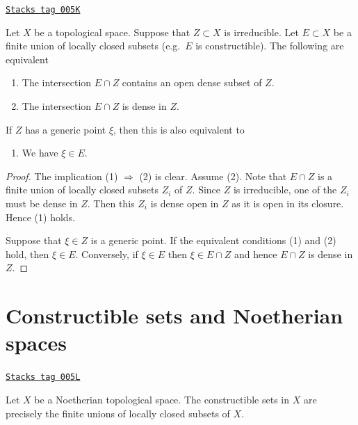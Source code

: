 \begin{lemma}
\label{topology-lemma-generic-point-in-constructible}
\href{https://stacks.math.columbia.edu/tag/005K}{\texttt{Stacks tag 005K}}

Let $X$ be a topological space. Suppose that
$Z \subset X$ is irreducible. Let $E \subset X$
be a finite union of locally closed subsets (e.g.\ $E$
is constructible). The following are equivalent
\begin{enumerate}
\item The intersection $E \cap Z$ contains an open
dense subset of $Z$.
\item The intersection $E \cap Z$ is dense in $Z$.
\end{enumerate}
If $Z$ has a generic point $\xi$, then this is
also equivalent to
\begin{enumerate}
\item[(3)] We have $\xi \in E$.
\end{enumerate}
\end{lemma}

\begin{proof}
The implication (1) $\Rightarrow$ (2) is clear. Assume (2).
Note that $E \cap Z$ is a finite union of locally closed subsets
$Z_i$ of $Z$. Since $Z$ is irreducible, one of the $Z_i$ must
be dense in $Z$. Then this $Z_i$ is dense open in $Z$ as it is
open in its closure. Hence (1) holds.

\medskip\noindent
Suppose that $\xi \in Z$ is a generic point. If the equivalent conditions
(1) and (2) hold, then $\xi \in E$. Conversely, if $\xi \in E$ then
$\xi \in E \cap Z$ and hence $E \cap Z$ is dense in $Z$.
\end{proof}

\section{Constructible sets and Noetherian spaces}
\label{topology-section-constructible-Noetherian}
\begin{lemma}
\label{topology-lemma-constructible-Noetherian-space}
\href{https://stacks.math.columbia.edu/tag/005L}{\texttt{Stacks tag 005L}}

Let $X$ be a Noetherian topological space.
The constructible sets in $X$ are precisely the finite unions
of locally closed subsets of $X$.
\end{lemma}

